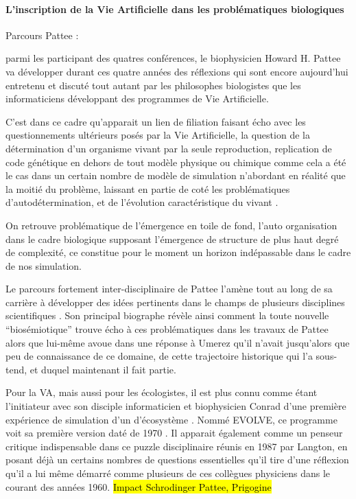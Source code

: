 \paragraph{L'inscription de la Vie Artificielle dans les problématiques biologiques}

Parcours Pattee : 

parmi les participant des quatres conférences, le biophysicien Howard H. Pattee va développer durant ces quatre années des réflexions qui sont encore aujourd'hui entretenu et discuté tout autant par les philosophes biologistes que les informaticiens développant des programmes de Vie Artificielle.

C'est dans ce cadre qu'apparait un lien de filiation faisant écho avec les questionnements ultérieurs posés par la Vie Artificielle, la question de la détermination d'un organisme vivant par la seule reproduction, replication de code génétique en dehors de tout modèle physique ou chimique comme cela a été le cas dans un certain nombre de modèle de simulation n'abordant en réalité que la moitié du problème, laissant en partie de coté les problématiques d'autodétermination, et de l'évolution caractéristique du vivant \autocite{Mossio}.

On retrouve problématique de l'émergence en toile de fond, l'auto organisation dans le cadre biologique supposant l'émergence de structure de plus haut degré de complexité, ce constitue pour le moment un horizon indépassable dans le cadre de nos simulation.


Le parcours fortement inter-disciplinaire de Pattee l'amène tout au long de sa carrière à développer des idées pertinents dans le champs de plusieurs disciplines scientifiques \textcite{Umerez2001}. Son principal biographe  \textcite{Umerez2009} révèle ainsi comment la toute nouvelle \enquote{biosémiotique} trouve écho à ces problématiques dans les travaux de Pattee alors que lui-même avoue dans une réponse à Umerez \autocite{Pattee2009} qu'il n'avait jusqu'alors que peu de connaissance de ce domaine, de cette trajectoire historique qui l'a sous-tend, et duquel maintenant il fait partie. 

Pour la VA, mais aussi pour les écologistes, il est plus connu comme étant l'initiateur avec son disciple informaticien et biophysicien Conrad d'une première expérience de simulation d'un d'écosystème . Nommé EVOLVE, ce programme  voit sa première version daté de 1970 \autocites{Conrad1970, Pattee2002}. Il apparait également comme un penseur critique indispensable dans ce puzzle disciplinaire réunis en 1987 par Langton, en posant déjà un certains nombres de questions essentielles qu'il tire d'une réflexion qu'il a lui même démarré comme plusieurs de ces collègues physiciens dans le courant des années 1960. \hl{Impact Schrodinger Pattee, Prigogine} \autocite{Pattee1988}

